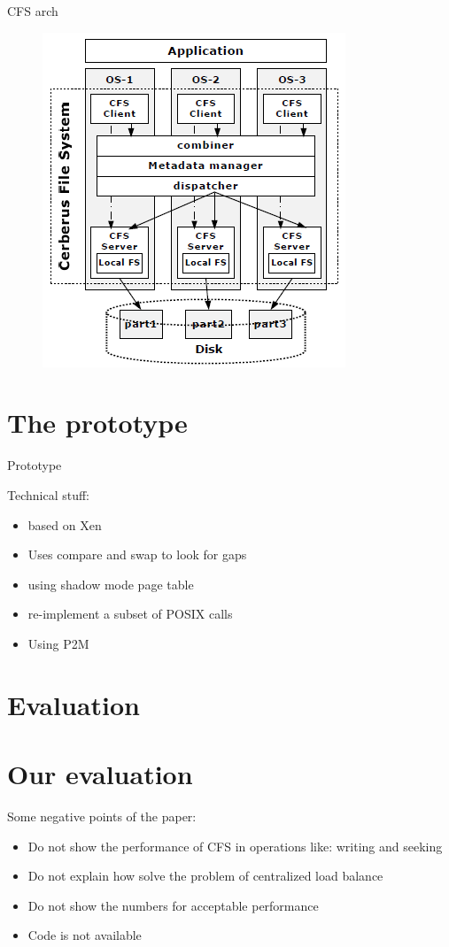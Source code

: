 \documentclass{beamer}
\begin{document}
	\begin{frame}{CFS arch}

		\begin{figure} [H]
			\centering
			\includegraphics[scale=0.40]{img/cerberus-cfs}
		\end{figure}	

	\end{frame}

\section{The prototype}

	\begin{frame}{Prototype}

	Technical stuff:
	\begin{itemize}
	\item based on Xen
	\item Uses compare and swap to look for gaps
	\item using shadow mode page table
	\item re-implement a subset of POSIX calls
	\item Using P2M
	\end{itemize}
	
	\end{frame}

\section{Evaluation}

		
	
\section{Our evaluation}
	Some negative points of the paper:
	\begin{itemize}
	\item Do not show the performance of CFS in operations like: writing and seeking
	\item Do not explain how solve the problem of centralized load balance
	\item Do not show the numbers for acceptable performance
	\item Code is not available
	\end{itemize}
\end{document}
